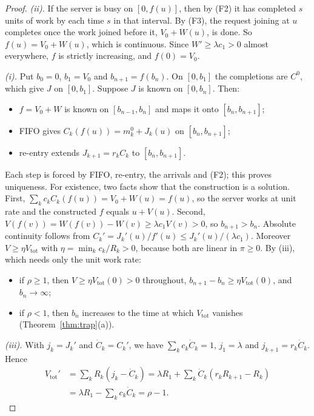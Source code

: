 \begin{proof}
\emph{(ii).} If the server is busy on $[0,f(u)]$, then by (F2) it has completed $s$ units of work by each time $s$ in that
interval. By (F3), the request joining at $u$ completes once the work joined before it, $V_0+W(u)$, is done. So
$f(u)=V_0+W(u)$, which is continuous. Since $W'\ge\lambda c_1>0$ almost everywhere, $f$ is strictly increasing, and
$f(0)=V_0$.

\emph{(i).} Put $b_0=0$, $b_1=V_0$ and $b_{n+1}=f(b_n)$. On $[0,b_1]$ the completions are $C^0$, which give $J$ on
$[0,b_1]$. Suppose $J$ is known on $[0,b_n]$. Then:
\begin{itemize}[leftmargin=*,nosep]
\item $f=V_0+W$ is known on $[b_{n-1},b_n]$ and maps it onto $[b_n,b_{n+1}]$;
\item FIFO gives $C_k(f(u))=m^0_k+J_k(u)$ on $[b_n,b_{n+1}]$;
\item re-entry extends $J_{k+1}=r_kC_k$ to $[b_n,b_{n+1}]$.
\end{itemize}
Each step is forced by FIFO, re-entry, the arrivals and (F2); this proves uniqueness. For existence, two facts show that the
construction is a solution. First, $\sum_kc_kC_k(f(u))=V_0+W(u)=f(u)$, so the server works at unit rate and the constructed
$f$ equals $u+V(u)$. Second, $V(f(v))=W(f(v))-W(v)\ge\lambda c_1V(v)>0$, so $b_{n+1}>b_n$. Absolute continuity follows from
$C_k'=J_k'(u)/f'(u)\le J_k'(u)/(\lambda c_1)$. Moreover $V\ge\eta V_{\mathrm{tot}}$ with $\eta=\min_kc_k/R_k>0$, because both
are linear in $\pi\ge0$. By (iii), which needs only the unit work rate:
\begin{itemize}[leftmargin=*,nosep]
\item if $\rho\ge1$, then $V\ge\eta V_{\mathrm{tot}}(0)>0$ throughout, $b_{n+1}-b_n\ge\eta V_{\mathrm{tot}}(0)$, and
$b_n\to\infty$;
\item if $\rho<1$, then $b_n$ increases to the time at which $V_{\mathrm{tot}}$ vanishes (Theorem~\ref{thm:trap}(a)).
\end{itemize}

\emph{(iii).} With $j_k=J_k'$ and $\dot C_k=C_k'$, we have $\sum_kc_k\dot C_k=1$, $j_1=\lambda$ and $j_{k+1}=r_k\dot C_k$. Hence
\begin{align*}
V_{\mathrm{tot}}'&=\textstyle\sum_kR_k(j_k-\dot C_k)=\lambda R_1+\sum_k\dot C_k(r_kR_{k+1}-R_k)\\
&=\textstyle\lambda R_1-\sum_kc_k\dot C_k=\rho-1.
\end{align*}


\end{proof}
